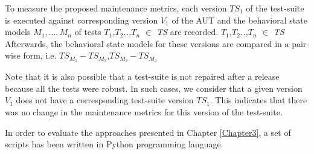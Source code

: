 To measure the proposed maintenance metrics, each version $TS_1$ of the test-suite is executed against corresponding version $V_1$ of the AUT and the behavioral state models \textit{${M_1},...,{M_n}$} of tests \textit{$T_1$,$T_2$..,$T_n$ $\in$ TS} are recorded.  \textit{$T_1$,$T_2$..,$T_n$ $\in$ TS} Afterwards, the behavioral state models for these versions are compared in a pair-wise form, i.e. \textit{$TS_{M_1} - TS_{M_2}$},\textit{$TS_{M_2} - TS_{M_3}$}

Note that it is also possible that a test-suite is not repaired after a release because all the tests were robust. In such cases, we consider that a given version $V_1$ does not have a corresponding test-suite version $TS_1$. This indicates that there was no change in the maintenance metrics for this version of the test-suite. 

In order to evaluate the approaches presented in Chapter \ref{Chapter3}, a set of scripts has been written in Python programming language. 
